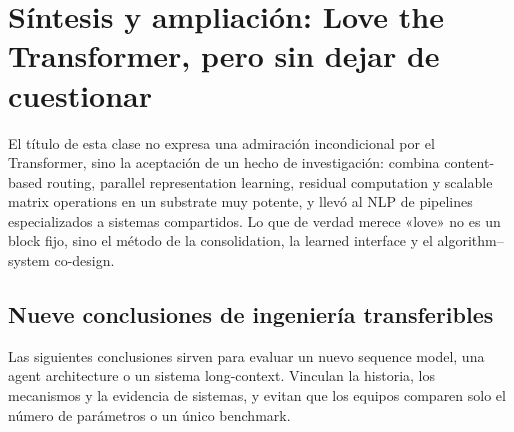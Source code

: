 \section{Síntesis y ampliación: Love the Transformer, pero sin dejar de cuestionar}

El título de esta clase no expresa una admiración incondicional por el Transformer, sino la aceptación de un hecho de investigación: combina content-based routing, parallel representation learning, residual computation y scalable matrix operations en un substrate muy potente, y llevó al NLP de pipelines especializados a sistemas compartidos. Lo que de verdad merece «love» no es un block fijo, sino el método de la consolidation, la learned interface y el algorithm--system co-design.

\subsection{Nueve conclusiones de ingeniería transferibles}

Las siguientes conclusiones sirven para evaluar un nuevo sequence model, una agent architecture o un sistema long-context. Vinculan la historia, los mecanismos y la evidencia de sistemas, y evitan que los equipos comparen solo el número de parámetros o un único benchmark.

